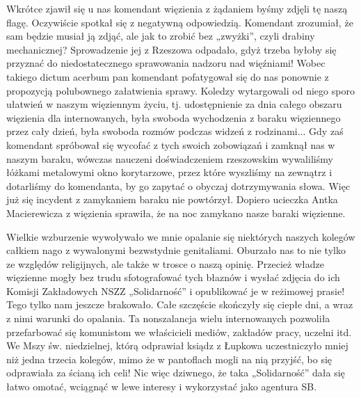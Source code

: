 Wkrótce zjawił się u nas komendant więzienia z żądaniem byśmy zdjęli tę naszą flagę. Oczywiście spotkał się z negatywną odpowiedzią. Komendant zrozumiał, że sam będzie musiał ją zdjąć, ale jak to zrobić bez „zwyżki”, czyli drabiny mechanicznej? Sprowadzenie jej z Rzeszowa odpadało, gdyż trzeba byłoby się przyznać do niedostatecznego sprawowania nadzoru nad więźniami! Wobec takiego dictum acerbum pan komendant pofatygował się do nas ponownie z propozycją polubownego załatwienia sprawy. Koledzy wytargowali od niego sporo ułatwień w naszym więziennym życiu, tj. udostępnienie za dnia całego obszaru więzienia dla internowanych, była swoboda wychodzenia z baraku więziennego przez cały dzień, była swoboda rozmów podczas widzeń z rodzinami... Gdy zaś komendant spróbował się wycofać z tych swoich zobowiązań i zamknął nas w naszym baraku, wówczas nauczeni doświadczeniem rzeszowskim wywaliliśmy łóżkami metalowymi okno korytarzowe, przez które wyszliśmy na zewnątrz i dotarliśmy do komendanta, by go zapytać o obyczaj dotrzymywania słowa. Więc już się incydent z zamykaniem baraku nie powtórzył. Dopiero ucieczka Antka Macierewicza z więzienia sprawiła, że na noc zamykano nasze baraki więzienne.

Wielkie wzburzenie wywoływało we mnie opalanie się niektórych naszych kolegów całkiem nago z wywalonymi bezwstydnie genitaliami. Oburzało nas to nie tylko ze względów religijnych, ale także w trosce o naszą opinię. Przecież władze więzienne mogły bez trudu sfotografować tych błaznów i wysłać zdjęcia do ich Komisji Zakładowych NSZZ „Solidarność” i opublikować je w reżimowej prasie! Tego tylko nam jeszcze brakowało. Całe szczęście skończyły się ciepłe dni, a wraz z nimi warunki do opalania. Ta nonszalancja wielu internowanych pozwoliła przefarbować się komunistom we właścicieli mediów, zakładów pracy, uczelni itd. We Mszy św. niedzielnej, którą odprawiał ksiądz z Łupkowa uczestniczyło mniej niż jedna trzecia kolegów, mimo że w pantoflach mogli na nią przyjść, bo się odprawiała za ścianą ich celi! Nic więc dziwnego, że taka „Solidarność” dała się łatwo omotać, wciągnąć w lewe interesy i wykorzystać jako agentura SB.

